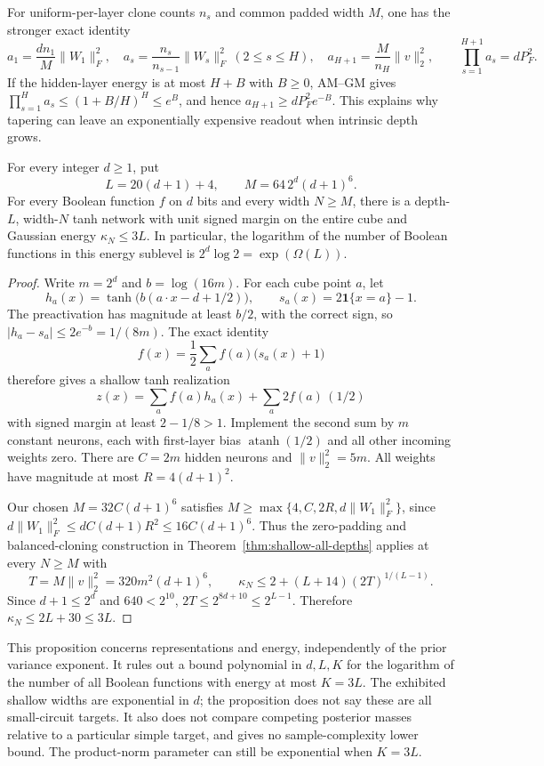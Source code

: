 For uniform-per-layer clone counts $n_s$ and common padded width $M$,
one has the stronger exact identity
\[
 a_1=\frac{dn_1}{M}\|W_1\|_F^2,\quad
 a_s=\frac{n_s}{n_{s-1}}\|W_s\|_F^2\ (2\le s\le H),\quad
 a_{H+1}=\frac{M}{n_H}\|v\|_2^2,\qquad
 \prod_{s=1}^{H+1}a_s=dP_F^2.
\]
If the hidden-layer energy is at most $H+B$ with $B\ge0$, AM--GM
gives $\prod_{s=1}^H a_s\le(1+B/H)^H\le e^B$, and hence
$a_{H+1}\ge dP_F^2e^{-B}$. This explains why tapering can leave an
exponentially expensive readout when intrinsic depth grows.

\begin{proposition}
\label{prop:all-functions-linear-energy}
For every integer $d\ge1$, put
\[
 L=20(d+1)+4,\qquad M=64\,2^d(d+1)^6.
\]
For every Boolean function $f$ on $d$ bits and every width $N\ge M$,
there is a depth-$L$, width-$N$ tanh network with unit signed margin
on the entire cube and Gaussian energy $\kappa_N\le3L$.
In particular, the logarithm of the number of Boolean functions in this
energy sublevel is $2^d\log2=\exp(\Omega(L))$.
\end{proposition}

\begin{proof}
Write $m=2^d$ and $b=\log(16m)$. For each cube point $a$, let
\[
 h_a(x)=\tanh\bigl(b(a\cdot x-d+1/2)\bigr),\qquad
 s_a(x)=2\mathbf1\{x=a\}-1.
\]
The preactivation has magnitude at least $b/2$, with the correct sign,
so $|h_a-s_a|\le2e^{-b}=1/(8m)$. The exact identity
\[
 f(x)=\frac12\sum_a f(a)\bigl(s_a(x)+1\bigr)
\]
therefore gives a shallow tanh realization
\[
 z(x)=\sum_a f(a)h_a(x)+\sum_a 2f(a)\,(1/2)
\]
with signed margin at least $2-1/8>1$. Implement the second sum by
$m$ constant neurons, each with first-layer bias
$\operatorname{atanh}(1/2)$ and all other incoming weights zero.
There are $C=2m$ hidden neurons and $\|v\|_2^2=5m$.
All weights have magnitude at most $R=4(d+1)^2$.

Our chosen $M=32C(d+1)^6$ satisfies
$M\ge\max\{4,C,2R,d\|W_1\|_F^2\}$, since
$d\|W_1\|_F^2\le dC(d+1)R^2\le16C(d+1)^6$.
Thus the zero-padding and balanced-cloning construction in
Theorem~\ref{thm:shallow-all-depths} applies at every $N\ge M$ with
\[
 T=M\|v\|_2^2=320m^2(d+1)^6,
 \qquad \kappa_N\le2+(L+14)(2T)^{1/(L-1)}.
\]
Since $d+1\le2^d$ and $640<2^{10}$,
$2T\le2^{8d+10}\le2^{L-1}$. Therefore
$\kappa_N\le2L+30\le3L$.
\end{proof}

This proposition concerns representations and energy, independently of
the prior variance exponent. It rules out a bound polynomial in $d,L,K$
for the logarithm of the number of all Boolean functions with energy
at most $K=3L$. The exhibited shallow widths are exponential in $d$;
the proposition does not say these are all small-circuit targets.
It also does not compare competing posterior masses relative to a
particular simple target, and gives no sample-complexity lower bound.
The product-norm parameter can still be exponential when $K=3L$.
